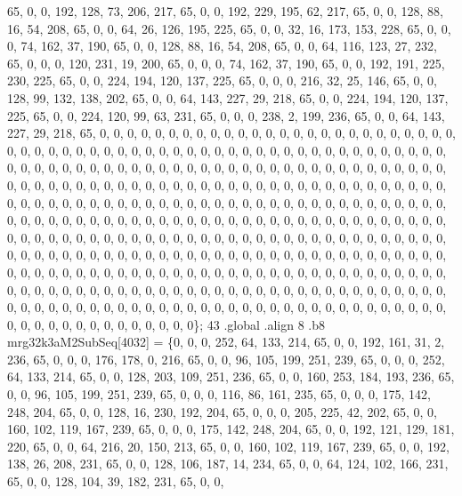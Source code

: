 \begin{DoxyCode}
       65, 0, 0, 192, 128, 73, 206, 217, 65, 0, 0, 192, 229, 195, 62, 217, 65, 0, 0, 128, 88, 16, 54, 208, 65, 0, 0,
       64, 26, 126, 195, 225, 65, 0, 0, 32, 16, 173, 153, 228, 65, 0, 0, 0, 74, 162, 37, 190, 65, 0, 0, 128, 88,
       16, 54, 208, 65, 0, 0, 64, 116, 123, 27, 232, 65, 0, 0, 0, 120, 231, 19, 200, 65, 0, 0, 0, 74, 162, 37, 190,
       65, 0, 0, 192, 191, 225, 230, 225, 65, 0, 0, 224, 194, 120, 137, 225, 65, 0, 0, 0, 216, 32, 25, 146, 65, 0,
       0, 128, 99, 132, 138, 202, 65, 0, 0, 64, 143, 227, 29, 218, 65, 0, 0, 224, 194, 120, 137, 225, 65, 0, 0,
       224, 120, 99, 63, 231, 65, 0, 0, 0, 238, 2, 199, 236, 65, 0, 0, 64, 143, 227, 29, 218, 65, 0, 0, 0, 0, 0, 0, 0,
       0, 0, 0, 0, 0, 0, 0, 0, 0, 0, 0, 0, 0, 0, 0, 0, 0, 0, 0, 0, 0, 0, 0, 0, 0, 0, 0, 0, 0, 0, 0, 0, 0, 0, 0, 0,
       0, 0, 0, 0, 0, 0, 0, 0, 0, 0, 0, 0, 0, 0, 0, 0, 0, 0, 0, 0, 0, 0, 0, 0, 0, 0, 0, 0, 0, 0, 0, 0, 0, 0, 0, 0,
       0, 0, 0, 0, 0, 0, 0, 0, 0, 0, 0, 0, 0, 0, 0, 0, 0, 0, 0, 0, 0, 0, 0, 0, 0, 0, 0, 0, 0, 0, 0, 0, 0, 0, 0, 0,
       0, 0, 0, 0, 0, 0, 0, 0, 0, 0, 0, 0, 0, 0, 0, 0, 0, 0, 0, 0, 0, 0, 0, 0, 0, 0, 0, 0, 0, 0, 0, 0, 0, 0, 0, 0,
       0, 0, 0, 0, 0, 0, 0, 0, 0, 0, 0, 0, 0, 0, 0, 0, 0, 0, 0, 0, 0, 0, 0, 0, 0, 0, 0, 0, 0, 0, 0, 0, 0, 0, 0, 0,
       0, 0, 0, 0, 0, 0, 0, 0, 0, 0, 0, 0, 0, 0, 0, 0, 0, 0, 0, 0, 0, 0, 0, 0, 0, 0, 0, 0, 0, 0, 0, 0, 0, 0, 0, 0,
       0, 0, 0, 0, 0, 0, 0, 0, 0, 0, 0, 0, 0, 0, 0, 0, 0, 0, 0, 0, 0, 0, 0, 0, 0, 0, 0, 0, 0, 0, 0, 0, 0, 0, 0, 0,
       0, 0, 0, 0, 0, 0, 0, 0, 0, 0, 0, 0, 0, 0, 0, 0, 0, 0, 0, 0, 0, 0, 0, 0, 0, 0, 0, 0, 0, 0, 0, 0, 0, 0, 0, 0,
       0, 0, 0, 0, 0, 0, 0, 0, 0, 0, 0, 0, 0, 0, 0, 0, 0, 0, 0, 0, 0, 0, 0, 0, 0, 0, 0, 0, 0, 0, 0, 0, 0, 0, 0, 0,
       0, 0, 0, 0, 0, 0, 0, 0, 0, 0, 0, 0, 0, 0, 0, 0, 0, 0, 0, 0, 0, 0, 0, 0, 0, 0, 0, 0, 0\};
43 .global .align 8 .b8 mrg32k3aM2SubSeq[4032] = \{0, 0, 0, 252, 64, 133, 214, 65, 0, 0, 192, 161, 31, 2, 236,
       65, 0, 0, 0, 176, 178, 0, 216, 65, 0, 0, 96, 105, 199, 251, 239, 65, 0, 0, 0, 252, 64, 133, 214, 65, 0, 0,
       128, 203, 109, 251, 236, 65, 0, 0, 160, 253, 184, 193, 236, 65, 0, 0, 96, 105, 199, 251, 239, 65, 0, 0, 0,
       116, 86, 161, 235, 65, 0, 0, 0, 175, 142, 248, 204, 65, 0, 0, 128, 16, 230, 192, 204, 65, 0, 0, 0, 205, 225,
       42, 202, 65, 0, 0, 160, 102, 119, 167, 239, 65, 0, 0, 0, 175, 142, 248, 204, 65, 0, 0, 192, 121, 129, 181,
       220, 65, 0, 0, 64, 216, 20, 150, 213, 65, 0, 0, 160, 102, 119, 167, 239, 65, 0, 0, 192, 138, 26, 208, 231, 65,
       0, 0, 128, 106, 187, 14, 234, 65, 0, 0, 64, 124, 102, 166, 231, 65, 0, 0, 128, 104, 39, 182, 231, 65, 0, 0,

\end{DoxyCode}
